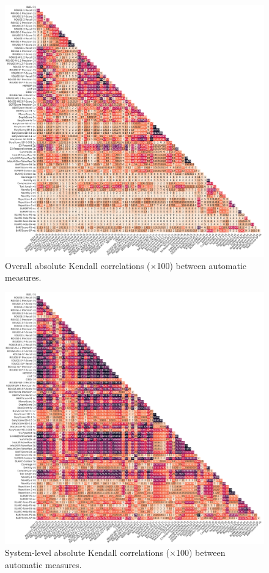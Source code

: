 \begin{figure}[!ht]
\centering
    \centering
    \includegraphics[width=\columnwidth]{pictures/metrics_story_kendall.pdf}
    \caption{Overall absolute Kendall correlations ($\times$100) between automatic measures.}
    \label{fig:story_level_measures_correlations_kendall}
\end{figure}

\begin{figure}[!ht]
\centering
\includegraphics[width=\columnwidth]{pictures/metrics_system_kendall.pdf}
\caption{System-level absolute Kendall correlations ($\times$100) between automatic measures.}
\label{fig:system_level_measures_correlations_kendall}
\end{figure}

